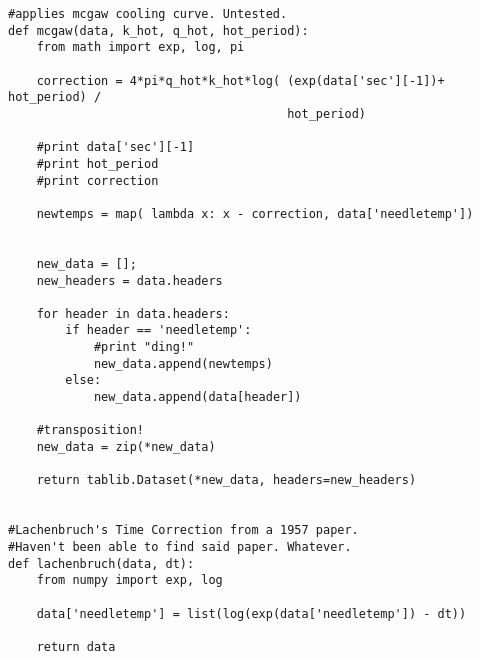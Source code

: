 \begin{verbatim}
#applies mcgaw cooling curve. Untested.
def mcgaw(data, k_hot, q_hot, hot_period):
    from math import exp, log, pi

    correction = 4*pi*q_hot*k_hot*log( (exp(data['sec'][-1])+ hot_period) /
                                       hot_period)

    #print data['sec'][-1]
    #print hot_period
    #print correction

    newtemps = map( lambda x: x - correction, data['needletemp'])


    new_data = [];
    new_headers = data.headers

    for header in data.headers:
        if header == 'needletemp':
            #print "ding!"
            new_data.append(newtemps)
        else:
            new_data.append(data[header])

    #transposition!
    new_data = zip(*new_data)

    return tablib.Dataset(*new_data, headers=new_headers)
    

#Lachenbruch's Time Correction from a 1957 paper.
#Haven't been able to find said paper. Whatever.
def lachenbruch(data, dt):
    from numpy import exp, log

    data['needletemp'] = list(log(exp(data['needletemp']) - dt))

    return data
\end{verbatim}
\normalsize
